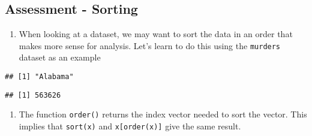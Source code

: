 \documentclass[
]{article}
\newenvironment{Shaded}{\begin{snugshade}}{\end{snugshade}}
\newcommand{\CommentTok}[1]{\textcolor[rgb]{0.56,0.35,0.01}{\textit{#1}}}
\newcommand{\DecValTok}[1]{\textcolor[rgb]{0.00,0.00,0.81}{#1}}
\newcommand{\KeywordTok}[1]{\textcolor[rgb]{0.13,0.29,0.53}{\textbf{#1}}}
\newcommand{\NormalTok}[1]{#1}
\newcommand{\OperatorTok}[1]{\textcolor[rgb]{0.81,0.36,0.00}{\textbf{#1}}}
\newcommand{\StringTok}[1]{\textcolor[rgb]{0.31,0.60,0.02}{#1}}
\providecommand{\tightlist}{%
  \setlength{\itemsep}{0pt}\setlength{\parskip}{0pt}}
\begin{document}
\hypertarget{assessment---sorting}{%
\subsection{Assessment - Sorting}\label{assessment---sorting}}

\begin{enumerate}
\def\labelenumi{\arabic{enumi}.}
\tightlist
\item
  When looking at a dataset, we may want to sort the data in an order
  that makes more sense for analysis. Let's learn to do this using the
  \texttt{murders} dataset as an example
\end{enumerate}

\begin{Shaded}
\end{Shaded}

\begin{verbatim}
## [1] "Alabama"
\end{verbatim}

\begin{Shaded}
\end{Shaded}

\begin{verbatim}
## [1] 563626
\end{verbatim}

\begin{enumerate}
\def\labelenumi{\arabic{enumi}.}
\setcounter{enumi}{1}
\tightlist
\item
  The function \texttt{order()} returns the index vector needed to sort
  the vector. This implies that \texttt{sort(x)} and
  \texttt{x{[}order(x){]}} give the same result.
\end{enumerate}
\end{document}
